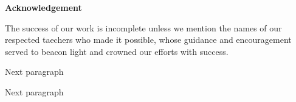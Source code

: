 \begin{center}
\begin{huge}
\bfseries{Acknowledgement}\\
\end{huge}
\end{center}
\vspace{1cm}
The success of our work is incomplete unless we mention the names of our respected taechers who made it possible, whose guidance and encouragement served to beacon light and crowned our efforts with success.

\noindent Next paragraph

\noindent Next paragraph